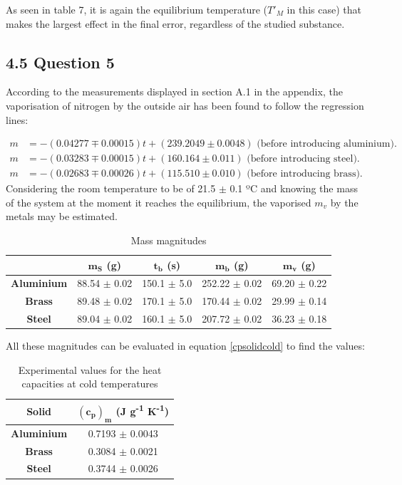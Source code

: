 \documentclass[a4paper, 12pt]{article}
\begin{document}
	As seen in table 7, it is again the equilibrium temperature ($T'_M$ in this case) that makes the largest effect in the final error, regardless of the studied substance.
	\subsection{4.5 Question 5}
	According to the measurements displayed in section A.1 in the appendix, the vaporisation of nitrogen by the outside air has been found to follow the regression lines:
	
	\begin{align}
		m &= -(0.04277 \mp 0.00015)t + (239.2049 \pm 0.0048)  \mbox{ (before introducing aluminium).} \\
		m &= -(0.03283 \mp 0.00015)t + (160.164 \pm 0.011) \mbox{ (before introducing steel).} \\
		m &= -(0.02683 \mp 0.00026)t + (115.510 \pm 0.010) \mbox{ (before introducing brass).}
	\end{align}
	 Considering the room temperature to be of 21.5 $\pm$ 0.1 ºC and knowing the mass of the system at the moment it reaches the equilibrium, the vaporised $m_v$ by the metals may be estimated. 

		\begin{table}[h!]
			\centering
			\caption{Mass magnitudes}
			\begin{tabular}{| c | c | c | c | c |}
				\hline
				& $\boldsymbol{m_S}$ \textbf{(g)} & $\boldsymbol{t_b}$ \textbf{(s)} & $\boldsymbol{m_b}$ \textbf{(g)} & $\boldsymbol{m_v}$ \textbf{(g)} \\
				\hline
				\textbf{Aluminium} & 88.54 $\pm$ 0.02 & 150.1 $\pm$ 5.0 & 252.22 $\pm$ 0.02 & 69.20 $\pm$ 0.22\\
				\textbf{Brass} & 89.48 $\pm$ 0.02 & 170.1 $\pm$ 5.0 & 170.44 $\pm$ 0.02 & 29.99 $\pm$ 0.14\\
				\textbf{Steel} & 89.04 $\pm$ 0.02 & 160.1 $\pm$ 5.0 & 207.72 $\pm$ 0.02 & 36.23 $\pm$ 0.18\\
				\hline
			\end{tabular}
		
		\end{table}
	All these magnitudes can be evaluated in equation \ref{cpsolidcold} to find the values:
		\begin{table}[h!]
		\centering
		\caption{Experimental values for the heat capacities at cold temperatures}
		\begin{tabular}{|c|c|}
			\hline
			\textbf{Solid} & $\boldsymbol{(c_p)_m}$ \textbf{(J g\textsuperscript{-1} K\textsuperscript{-1}})\\
			\hline
			\textbf{Aluminium} & 0.7193 $\pm$ 0.0043 \\
			\textbf{Brass} & 0.3084 $\pm$ 0.0021 \\
			\textbf{Steel} & 0.3744 $\pm$ 0.0026 \\
			\hline
		\end{tabular}
		
	\end{table}
\end{document}
